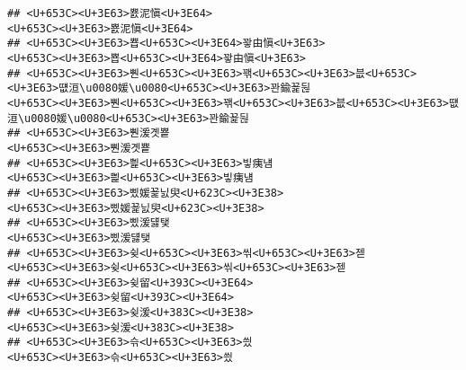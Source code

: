 \documentclass[]{article}
\begin{document}
\begin{verbatim}
## <U+653C><U+3E63>뾼泥愼<U+3E64>                                                                                                                                                                                   <U+653C><U+3E63>뾼泥愼<U+3E64>
## <U+653C><U+3E63>뿁<U+653C><U+3E64>꽣由愼<U+3E63>                                                                                                                                                           <U+653C><U+3E63>뿁<U+653C><U+3E64>꽣由愼<U+3E63>
## <U+653C><U+3E63>뿬<U+653C><U+3E63>꽦<U+653C><U+3E63>븞<U+653C><U+3E63>떖洹\u0080媛\u0080<U+653C><U+3E63>꽌鍮꾩뒪                                                         <U+653C><U+3E63>뿬<U+653C><U+3E63>꽦<U+653C><U+3E63>븞<U+653C><U+3E63>떖洹\u0080媛\u0080<U+653C><U+3E63>꽌鍮꾩뒪
## <U+653C><U+3E63>뿬湲곗뿉                                                                                                                                                                                         <U+653C><U+3E63>뿬湲곗뿉
## <U+653C><U+3E63>삁<U+653C><U+3E63>빟痍냼                                                                                                                                                                     <U+653C><U+3E63>삁<U+653C><U+3E63>빟痍냼
## <U+653C><U+3E63>삤媛꾩닔臾<U+623C><U+3E38>                                                                                                                                                                 <U+653C><U+3E63>삤媛꾩닔臾<U+623C><U+3E38>
## <U+653C><U+3E63>삤湲덇탳                                                                                                                                                                                         <U+653C><U+3E63>삤湲덇탳
## <U+653C><U+3E63>슂<U+653C><U+3E63>씪<U+653C><U+3E63>젣                                                                                                                                                     <U+653C><U+3E63>슂<U+653C><U+3E63>씪<U+653C><U+3E63>젣
## <U+653C><U+3E63>슂留<U+393C><U+3E64>                                                                                                                                                                             <U+653C><U+3E63>슂留<U+393C><U+3E64>
## <U+653C><U+3E63>슂湲<U+383C><U+3E38>                                                                                                                                                                             <U+653C><U+3E63>슂湲<U+383C><U+3E38>
## <U+653C><U+3E63>슦<U+653C><U+3E63>씠                                                                                                                                                                             <U+653C><U+3E63>슦<U+653C><U+3E63>씠

\end{verbatim}
\end{document}
